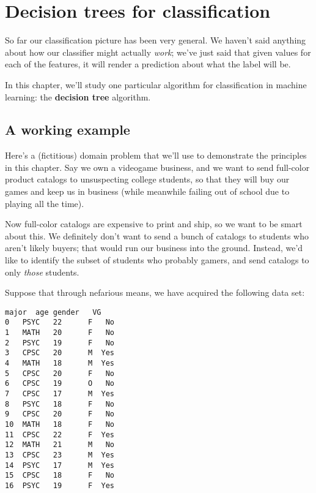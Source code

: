 
\chapter{Decision trees for classification}

So far our classification picture has been very general. We haven't said
anything about how our classifier might actually \textit{work}; we've just said
that given values for each of the features, it will render a prediction about
what the label will be.


In this chapter, we'll study one particular algorithm for classification in
machine learning: the \textbf{decision tree} algorithm.

\section{A working example}

 
Here's a (fictitious) domain problem that we'll use to demonstrate the
principles in this chapter. Say we own a videogame business, and we want to
send full-color product catalogs to unsuspecting college students, so that they
will buy our games and keep us in business (while meanwhile failing out of
school due to playing all the time).

Now full-color catalogs are expensive to print and ship, so we want to be smart
about this. We definitely don't want to send a bunch of catalogs to students
who aren't likely buyers; that would run our business into the ground. Instead,
we'd like to identify the subset of students who probably gamers, and send
catalogs to only \textit{those} students.

Suppose that through nefarious means, we have acquired the following data set:

\begin{Verbatim}[fontsize=\small,samepage=true,frame=single,framesep=3mm,xleftmargin=4.3cm,xrightmargin=4.2cm]
   major  age gender   VG
0   PSYC   22      F   No
1   MATH   20      F   No
2   PSYC   19      F   No
3   CPSC   20      M  Yes
4   MATH   18      M  Yes
5   CPSC   20      F   No
6   CPSC   19      O   No
7   CPSC   17      M  Yes
8   PSYC   18      F   No
9   CPSC   20      F   No
10  MATH   18      F   No
11  CPSC   22      F  Yes
12  MATH   21      M   No
13  CPSC   23      M  Yes
14  PSYC   17      M  Yes
15  CPSC   18      F   No
16  PSYC   19      F  Yes
\end{Verbatim}

